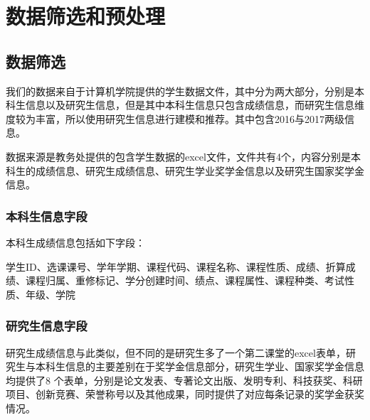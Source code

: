 %
%
%
%
%
%

\chapter{数据筛选和预处理}

\section{数据筛选}

我们的数据来自于计算机学院提供的学生数据文件，其中分为两大部分，分别是本科生信息以及研究生信息，但是其中本科生信息只包含成绩信息，而研究生信息维度较为丰富，所以使用研究生信息进行建模和推荐。其中包含2016与2017两级信息。

数据来源是教务处提供的包含学生数据的excel文件，文件共有4个，内容分别是本科生的成绩信息、研究生成绩信息、研究生学业奖学金信息以及研究生国家奖学金信息。

\subsection{本科生信息字段}

本科生成绩信息包括如下字段：

学生ID、选课课号、学年学期、课程代码、课程名称、课程性质、成绩、折算成绩、课程归属、重修标记、学分创建时间、绩点、课程属性、课程种类、考试性质、年级、学院

\subsection{研究生信息字段}

研究生成绩信息与此类似，但不同的是研究生多了一个第二课堂的excel表单，研究生与本科生信息的主要差别在于奖学金信息部分，研究生学业、国家奖学金信息均提供了8 个表单，分别是论文发表、专著论文出版、发明专利、科技获奖、科研项目、创新竞赛、荣誉称号以及其他成果，同时提供了对应每条记录的奖学金获奖情况。

